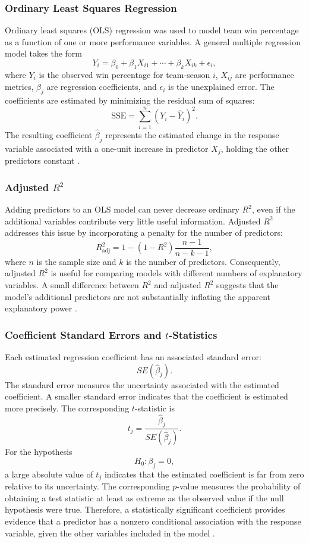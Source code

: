 \documentclass[11pt]{article}
\begin{document}
\subsubsection*{Ordinary Least Squares Regression} 
Ordinary least squares (OLS) regression was used to model team win percentage as a function of one or more performance variables. A general multiple regression model takes the form \[ Y_i = \beta_0 + \beta_1X_{i1} + \cdots + \beta_kX_{ik} + \epsilon_i, \] where $Y_i$ is the observed win percentage for team-season $i$, $X_{ij}$ are performance metrics, $\beta_j$ are regression coefficients, and $\epsilon_i$ is the unexplained error. The coefficients are estimated by minimizing the residual sum of squares: \[ \mathrm{SSE} = \sum_{i=1}^{n} (Y_i-\hat{Y}_i)^2. \] The resulting coefficient $\hat{\beta}_j$ represents the estimated change in the response variable associated with a one-unit increase in predictor $X_j$, holding the other predictors constant \cite{ols}.

\subsubsection*{Adjusted $R^2$} 
Adding predictors to an OLS model can never decrease ordinary $R^2$, even if the additional variables contribute very little useful information. Adjusted $R^2$ addresses this issue by incorporating a penalty for the number of predictors: \[ R^2_{\mathrm{adj}} = 1- (1-R^2) \frac{n-1}{n-k-1}, \] where $n$ is the sample size and $k$ is the number of predictors. Consequently, adjusted $R^2$ is useful for comparing models with different numbers of explanatory variables. A small difference between $R^2$ and adjusted $R^2$ suggests that the model's additional predictors are not substantially inflating the apparent explanatory power \cite{adjusted_rsquared}.

\subsubsection*{Coefficient Standard Errors and $t$-Statistics} 
Each estimated regression coefficient has an associated standard error: \[ SE(\hat{\beta}_j). \] The standard error measures the uncertainty associated with the estimated coefficient. A smaller standard error indicates that the coefficient is estimated more precisely. The corresponding $t$-statistic is \[ t_j = \frac{\hat{\beta}_j} {SE(\hat{\beta}_j)}. \] For the hypothesis \[ H_0:\beta_j=0, \] a large absolute value of $t_j$ indicates that the estimated coefficient is far from zero relative to its uncertainty. The corresponding $p$-value measures the probability of obtaining a test statistic at least as extreme as the observed value if the null hypothesis were true. Therefore, a statistically significant coefficient provides evidence that a predictor has a nonzero conditional association with the response variable, given the other variables included in the model \cite{tstatistic,standarderror}.
\end{document}
